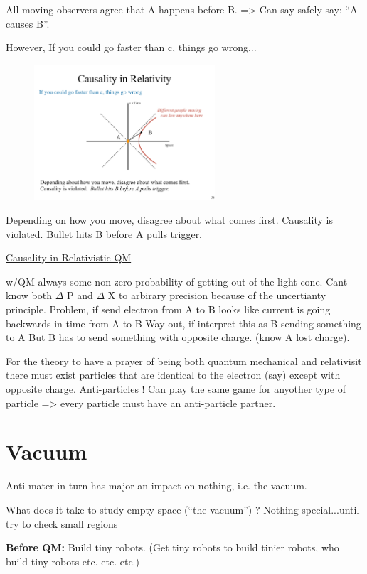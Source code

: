 {All moving observers agree that A happens before B. => Can say safely say: ``A causes B''.


However, If you could go faster than c, things go wrong...
\begin{figure}[h]
\centering
\includegraphics[width=0.6\textwidth]{./CausalitySpacelike.pdf}
\end{figure}

Depending on how you move, disagree about what comes first. Causality is violated. Bullet hits B before A pulls trigger.

\clearpage
\underline{Causality in Relativistic QM}

w/QM always some non-zero probability of getting out of the light cone.
Cant know both $\Delta$ P and $\Delta$ X to arbirary precision because of the uncertianty principle.
Problem, if send electron from A to B looks like current is going backwards in time from A to B
Way out, if interpret this as B sending something to A
But B has to send something with opposite charge. (know A lost charge).

For the theory to have a prayer of being both quantum mechanical and relativisit there must exist particles that are identical to the electron (say) except with opposite charge.
Anti-particles !
Can play the same game for anyother type of particle => every particle must have an anti-particle partner.

\section{Vacuum}
Anti-mater in turn has major an impact on nothing, i.e. the vacuum.

What does it take to study empty space (“the vacuum”) ?
Nothing special...until try to check small regions

\textbf{Before QM:}
Build tiny robots. (Get tiny robots to build tinier robots, who build tiny robots etc. etc. etc.)

}
